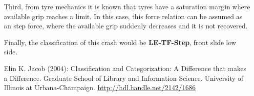 \documentclass{article}
\begin{document}
Third, from tyre mechanics it is known that tyres have a saturation margin where available grip reaches a limit.
%
In this case, this force relation can be assumed as an step force, where the available grip suddenly decreases and it is not recovered.


Finally, the classification of this crash would be \textbf{LE-TF-Step}, front slide low side.

\begin{thebibliography}{9}

     Elin K. Jacob (2004):  Classification and Categorization: A Difference that makes a Difference. Graduate School of Library and Information Science. University of Illinois at Urbana-Champaign. \url{http://hdl.handle.net/2142/1686}

\end{thebibliography}
\end{document}
